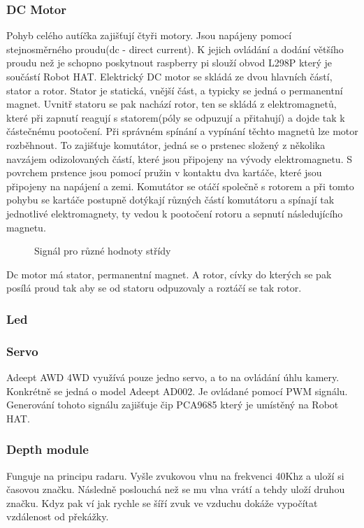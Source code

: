 \subsubsection*{DC Motor}
Pohyb celého autíčka zajišťují čtyři motory. Jsou napájeny pomocí stejnosměrného proudu(dc - direct current). K jejich ovládání a dodání většího proudu než je schopno poskytnout raspberry pi slouží obvod L298P který je součástí Robot HAT.
Elektrický DC motor se skládá ze dvou hlavních částí, stator a rotor. Stator je statická, vnější část, a typicky se jedná o permanentní magnet. Uvnitř statoru se pak nachází rotor, ten se skládá z elektromagnetů, které při zapnutí reagují s statorem(póly se odpuzují a přitahují) a dojde tak k částečnému pootočení. Při správném spínání a vypínání těchto magnetů lze motor rozběhnout. To zajišťuje komutátor, jedná se o prstenec složený z několika navzájem odizolovaných částí, které jsou připojeny na vývody elektromagnetu. S povrchem prstence jsou pomocí pružin v kontaktu dva kartáče, které jsou připojeny na napájení a zemi. Komutátor se otáčí společně s rotorem a při tomto pohybu se kartáče postupně dotýkají různých částí komutátoru a spínají tak jednotlivé elektromagnety, ty vedou k pootočení rotoru a sepnutí následujícího magnetu.

\begin{figure}[h!]
	\centering
	\caption{Signál pro různé hodnoty střídy}
	\label{}
\end{figure}

Dc motor má stator, permanentní magnet. A rotor, cívky do kterých se pak posílá proud tak aby se od statoru odpuzovaly a roztáčí se tak rotor.

\subsubsection*{Led}

\subsubsection*{Servo}
Adeept AWD 4WD využívá pouze jedno servo, a to na ovládání úhlu kamery. Konkrétně se jedná o model Adeept AD002. Je ovládané pomocí PWM signálu. Generování tohoto signálu zajišťuje čip PCA9685 který je umístěný na Robot HAT.

\subsubsection*{Depth module}
Funguje na principu radaru. Vyšle zvukovou vlnu na frekvenci 40Khz %
 a uloží si časovou značku. Následně poslouchá než se mu vlna vrátí a tehdy uloží druhou značku. Kdyz pak ví jak rychle se šíří zvuk ve vzduchu dokáže vypočítat vzdálenost od překážky.

